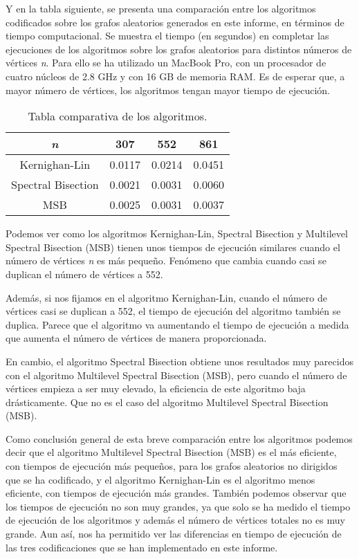 Y en la tabla siguiente, se presenta una comparación entre los algoritmos codificados sobre los grafos aleatorios generados en este informe, en términos de tiempo computacional. Se muestra el tiempo (en segundos) en completar las ejecuciones de los algoritmos sobre los grafos aleatorios para distintos números de vértices \textit{n}. Para ello se ha utilizado un MacBook Pro, con un procesador de cuatro núcleos de 2.8 GHz y con 16 GB de memoria RAM. Es de esperar que, a mayor número de vértices, los algoritmos tengan mayor tiempo de ejecución.

\renewcommand{\tablename}{Tabla}
\begin{table}[h]	
	\begin{center}
		\begin{tabular}{|c|c|c|c|}
			\hline
			\textit{n} & 307 & 552 & 861 \\
			\hline
			Kernighan-Lin & 0.0117 & 0.0214 & 0.0451\\
			\hline
			Spectral Bisection & 0.0021 & 0.0031 & 0.0060 \\
			\hline
			MSB & 0.0025 & 0.0031 & 0.0037 \\ 
			\hline
		\end{tabular}
		\vspace{1mm}
		\caption{Tabla comparativa de los algoritmos.}
	\end{center}
\end{table}

Podemos ver como los algoritmos Kernighan-Lin, Spectral Bisection y Multilevel Spectral Bisection (MSB) tienen unos tiempos de ejecución similares cuando el número de vértices \textit{n} es más pequeño. Fenómeno que cambia cuando casi se duplican el número de vértices a 552. 

\newpage
Además, si nos fijamos en el algoritmo Kernighan-Lin, cuando el número de vértices casi se duplican a 552, el tiempo de ejecución del algoritmo también se duplica. Parece que el algoritmo va aumentando el tiempo de ejecución a medida que aumenta el número de vértices de manera proporcionada.

En cambio, el algoritmo Spectral Bisection obtiene unos resultados muy parecidos con el algoritmo Multilevel Spectral Bisection (MSB), pero cuando el número de vértices empieza a ser muy elevado, la eficiencia de este algoritmo baja drásticamente. Que no es el caso del algoritmo Multilevel Spectral Bisection (MSB).

Como conclusión general de esta breve comparación entre los algoritmos podemos decir que el algoritmo Multilevel Spectral Bisection (MSB) es el más eficiente, con tiempos de ejecución más pequeños, para los grafos aleatorios no dirigidos que se ha codificado, y el algoritmo Kernighan-Lin es el algoritmo menos eficiente, con tiempos de ejecución más grandes. También podemos observar que los tiempos de ejecución no son muy grandes, ya que solo se ha medido el tiempo de ejecución de los algoritmos y además el número de vértices totales no es muy grande. Aun así, nos ha permitido ver las diferencias en tiempo de ejecución de las tres codificaciones que se han implementado en este informe.

